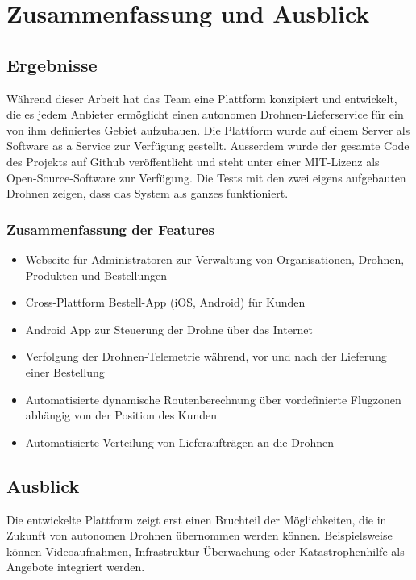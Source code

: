 \chapter{Zusammenfassung und Ausblick}

\section{Ergebnisse}

Während dieser Arbeit hat das Team eine Plattform konzipiert und entwickelt, die es jedem Anbieter ermöglicht einen autonomen Drohnen-Lieferservice für ein von ihm definiertes Gebiet aufzubauen. Die Plattform wurde auf einem Server als Software as a Service zur Verfügung gestellt. Ausserdem wurde der gesamte Code des Projekts auf Github veröffentlicht und steht unter einer \Gls{MIT-Lizenz} als Open-Source-Software zur Verfügung. Die Tests mit den zwei eigens aufgebauten Drohnen zeigen, dass das System als ganzes funktioniert.

\subsection{Zusammenfassung der Features}

\begin{itemize}
	\item Webseite für Administratoren zur Verwaltung von Organisationen, Drohnen, Produkten und Bestellungen
	\item Cross-Plattform Bestell-App (iOS, Android) für Kunden
	\item Android App zur Steuerung der Drohne über das Internet
	\item Verfolgung der Drohnen-Telemetrie während, vor und nach der Lieferung einer Bestellung
	\item Automatisierte dynamische Routenberechnung über vordefinierte Flugzonen abhängig von der Position des Kunden
	\item Automatisierte Verteilung von Lieferaufträgen an die Drohnen
\end{itemize}


\section{Ausblick}

Die entwickelte Plattform zeigt erst einen Bruchteil der Möglichkeiten, die in Zukunft von autonomen Drohnen übernommen werden können. Beispielsweise können Videoaufnahmen, Infrastruktur-Überwachung oder Katastrophenhilfe als Angebote integriert werden. 

